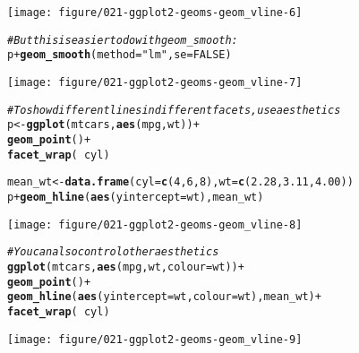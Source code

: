 \documentclass[a4paper,titlepage]{tufte-handout}\usepackage[]{graphicx}\usepackage[]{color}
\makeatletter
\def\maxwidth{ %
  \ifdim\Gin@nat@width>\linewidth
    \linewidth
  \else
    \Gin@nat@width
  \fi
}
\newcommand{\hlnum}[1]{\textcolor[rgb]{0.686,0.059,0.569}{#1}}%
\newcommand{\hlstr}[1]{\textcolor[rgb]{0.192,0.494,0.8}{#1}}%
\newcommand{\hlcom}[1]{\textcolor[rgb]{0.678,0.584,0.686}{\textit{#1}}}%
\newcommand{\hlopt}[1]{\textcolor[rgb]{0,0,0}{#1}}%
\newcommand{\hlstd}[1]{\textcolor[rgb]{0.345,0.345,0.345}{#1}}%
\newcommand{\hlkwb}[1]{\textcolor[rgb]{0.69,0.353,0.396}{#1}}%
\newcommand{\hlkwc}[1]{\textcolor[rgb]{0.333,0.667,0.333}{#1}}%
\newcommand{\hlkwd}[1]{\textcolor[rgb]{0.737,0.353,0.396}{\textbf{#1}}}%
\newenvironment{kframe}{%
 \def\at@end@of@kframe{}%
 \ifinner\ifhmode%
  \def\at@end@of@kframe{\end{minipage}}%
  \begin{minipage}{\columnwidth}%
 \fi\fi%
 \def\FrameCommand##1{\hskip\@totalleftmargin \hskip-\fboxsep
 \colorbox{shadecolor}{##1}\hskip-\fboxsep
     \hskip-\linewidth \hskip-\@totalleftmargin \hskip\columnwidth}%
 \MakeFramed {\advance\hsize-\width
   \@totalleftmargin\z@ \linewidth\hsize
   \@setminipage}}%
 {\par\unskip\endMakeFramed%
 \at@end@of@kframe}
\newenvironment{knitrout}{}{} %
\makeatother
\begin{document}
\begin{knitrout}
\texttt{[image: figure/021-ggplot2-geoms-geom\_vline-6]} 
\begin{kframe}\begin{alltt}
\hlcom{# But this is easier to do with geom_smooth:}
\hlstd{p} \hlopt{+} \hlkwd{geom_smooth}\hlstd{(}\hlkwc{method} \hlstd{=} \hlstr{"lm"}\hlstd{,} \hlkwc{se} \hlstd{=} \hlnum{FALSE}\hlstd{)}
\end{alltt}
\end{kframe}
\texttt{[image: figure/021-ggplot2-geoms-geom\_vline-7]} 
\begin{kframe}\begin{alltt}
\hlcom{# To show different lines in different facets, use aesthetics}
\hlstd{p} \hlkwb{<-} \hlkwd{ggplot}\hlstd{(mtcars,} \hlkwd{aes}\hlstd{(mpg, wt))} \hlopt{+}
  \hlkwd{geom_point}\hlstd{()} \hlopt{+}
  \hlkwd{facet_wrap}\hlstd{(}\hlopt{~} \hlstd{cyl)}

\hlstd{mean_wt} \hlkwb{<-} \hlkwd{data.frame}\hlstd{(}\hlkwc{cyl} \hlstd{=} \hlkwd{c}\hlstd{(}\hlnum{4}\hlstd{,} \hlnum{6}\hlstd{,} \hlnum{8}\hlstd{),} \hlkwc{wt} \hlstd{=} \hlkwd{c}\hlstd{(}\hlnum{2.28}\hlstd{,} \hlnum{3.11}\hlstd{,} \hlnum{4.00}\hlstd{))}
\hlstd{p} \hlopt{+} \hlkwd{geom_hline}\hlstd{(}\hlkwd{aes}\hlstd{(}\hlkwc{yintercept} \hlstd{= wt), mean_wt)}
\end{alltt}
\end{kframe}
\texttt{[image: figure/021-ggplot2-geoms-geom\_vline-8]} 
\begin{kframe}\begin{alltt}
\hlcom{# You can also control other aesthetics}
\hlkwd{ggplot}\hlstd{(mtcars,} \hlkwd{aes}\hlstd{(mpg, wt,} \hlkwc{colour} \hlstd{= wt))} \hlopt{+}
  \hlkwd{geom_point}\hlstd{()} \hlopt{+}
  \hlkwd{geom_hline}\hlstd{(}\hlkwd{aes}\hlstd{(}\hlkwc{yintercept} \hlstd{= wt,} \hlkwc{colour} \hlstd{= wt), mean_wt)} \hlopt{+}
  \hlkwd{facet_wrap}\hlstd{(}\hlopt{~} \hlstd{cyl)}
\end{alltt}
\end{kframe}
\texttt{[image: figure/021-ggplot2-geoms-geom\_vline-9]} 

\end{knitrout}
\end{document}
